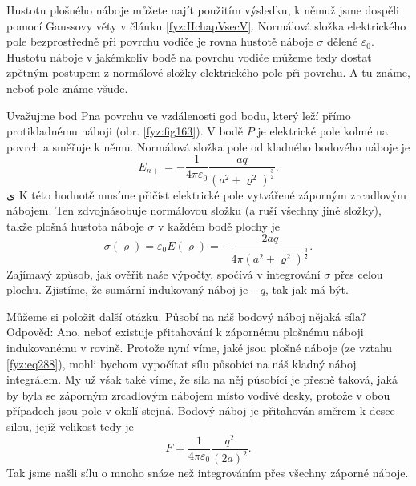 {    Hustotu plošného náboje můžete najít použitím výsledku, k němuž jsme dospěli pomocí Gaussovy 
    věty v článku \ref{fyz:IIchapVsecV}. Normálová složka elektrického pole bezprostředně při 
    povrchu vodiče je rovna hustotě náboje \(\sigma\) dělené \(\varepsilon_0\). Hustotu náboje v 
    jakémkoliv bodě na povrchu vodiče můžeme tedy dostat zpětným postupem z normálové složky 
    elektrického pole při povrchu. A tu známe, neboť pole známe všude.
    
    Uvažujme bod Pna povrchu ve vzdálenosti god bodu, který leží přímo protikladnému náboji (obr. 
    \ref{fyz:fig163}). V bodě \(P\) je elektrické pole kolmé na povrch a směřuje k němu. Normálová 
    složka pole od kladného bodového náboje je
    \begin{equation}\label{fyz:eq287}
     E_{n+} = -\dfrac{1}{4\pi\varepsilon_0}\frac{aq}{(a^2+\varrho^2)^{\frac{3}{2}}}.
    \end{equation}    ی
    K této hodnotě musíme přičíst elektrické pole vytvářené záporným zrcadlovým nábojem. Ten 
    zdvojnásobuje normálovou složku (a ruší všechny jiné složky), takže plošná hustota náboje 
    \(\sigma\) v každém bodě plochy je
    \begin{equation}\label{fyz:eq288}
     \sigma(\varrho) = \varepsilon_0E(\varrho) = -\frac{2aq}{4\pi(a^2+\varrho^2)^{\frac{3}{2}}}.
    \end{equation} 
    Zajímavý způsob, jak ověřit naše výpočty, spočívá v integrování \(\sigma\) přes celou 
    plochu. Zjistíme, že sumární indukovaný náboj je \(-q\), tak jak má být. 
    
    Můžeme si položit další otázku. Působí na náš bodový náboj nějaká síla? Odpověď: Ano, neboť
    existuje přitahování k zápornému plošnému náboji indukovanému v rovině. Protože nyní víme, jaké 
    jsou plošné náboje (ze vztahu \ref{fyz:eq288}), mohli bychom vypočítat sílu působící na náš 
    kladný náboj integrálem. My už však také víme, že síla na něj působící je přesně taková, jaká 
    by byla se záporným zrcadlovým nábojem místo vodivé desky, protože v obou případech jsou pole v 
    okolí stejná. Bodový náboj je přitahován směrem k desce silou, jejíž velikost tedy je
    \begin{equation}\label{fyz:eq289}
     F = \dfrac{1}{4\pi\varepsilon_0}\frac{q^2}{(2a)^2}.
    \end{equation} 
    Tak jsme našli sílu o mnoho snáze než integrováním přes všechny záporné náboje.
    
}
